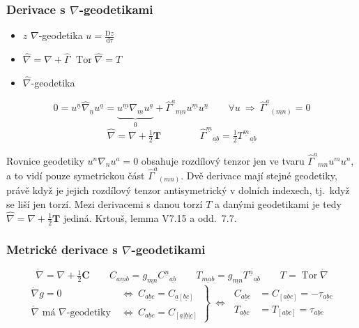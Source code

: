 \subsubsection*{Derivace s $\nabla$-geodetikami}
\begin{itemize}[nosep]
  \item[] $z$ $\nabla$-geodetika \qquad $u = \frac{\mathrm{D}z}{\mathrm{d}\tau}$
  \item[] $\hat\nabla = \nabla + \hat\Gamma$ \qquad $\operatorname{Tor}\hat\nabla = T$
  \item[] $\hat\nabla$-geodetika
\end{itemize}
\[
  0 = u^{\underline{n}}\hat\nabla_{\underline{n}}u^{\underline{a}} = \underbrace{u^{\underline{m}}\nabla_{\underline{m}}u^{\underline{a}}}_{0} + \hat\Gamma^{\underline{a}}{}_{\underline{mn}}u^{\underline{m}}u^{\underline{n}}
  \qquad \forall u \ \Rightarrow\ \hat\Gamma^{\underline{a}}{}_{(\underline{mn})} = 0
\]
\[
  \hat\nabla = \nabla + \tfrac12\mathbf{T} \qquad\qquad \hat\Gamma^{\underline{m}}{}_{\underline{ab}} = \tfrac12 T^{\underline{m}}{}_{\underline{ab}}
\]

\begin{vysvetleni}
Rovnice geodetiky $u^n\nabla_nu^a=0$ obsahuje rozdílový tenzor jen ve tvaru $\hat\Gamma^a{}_{mn}u^mu^n$, a to vidí pouze symetrickou část $\hat\Gamma^a{}_{(mn)}$. Dvě derivace mají stejné geodetiky, právě když je jejich rozdílový tenzor antisymetrický v dolních indexech, tj.\ když se liší jen torzí. Mezi derivacemi s danou torzí $T$ a danými geodetikami je tedy $\hat\nabla=\nabla+\tfrac12\mathbf{T}$ jediná. Krtouš, lemma V7.15 a odd.~7.7.
\end{vysvetleni}

\subsubsection*{Metrické derivace s $\nabla$-geodetikami}
\[
  \mathring\nabla = \nabla + \tfrac12\mathbf{C} \qquad C_{\underline{amb}} = g_{\underline{mn}}C^{\underline{n}}{}_{\underline{ab}} \qquad T_{\underline{mab}} = g_{\underline{mn}}T^{\underline{n}}{}_{\underline{ab}} \qquad T = \operatorname{Tor}\mathring\nabla
\]
\[
  \left.\begin{aligned}
    \mathring\nabla g = 0 &\ \Leftrightarrow\ C_{\underline{abc}} = C_{\underline{a}[\underline{bc}]} \\
    \mathring\nabla \text{ má } \nabla\text{-geodetiky} &\ \Leftrightarrow\ C_{\underline{abc}} = C_{[\underline{a}|\underline{b}|\underline{c}]}
  \end{aligned}\right\}
  \ \Leftrightarrow\
  \begin{aligned}
    C_{\underline{abc}} &= C_{[\underline{abc}]} = -\tau_{\underline{abc}} \\
    T_{\underline{abc}} &= T_{[\underline{abc}]} = \tau_{\underline{abc}}
  \end{aligned}
\]

